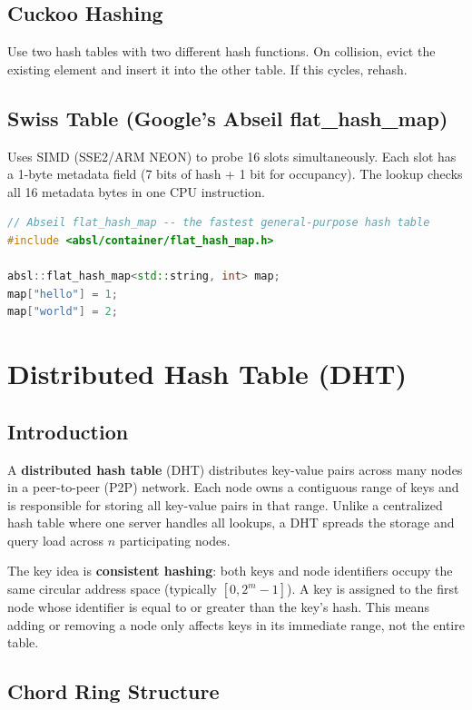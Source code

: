 \subsection{Cuckoo Hashing}

Use two hash tables with two different hash functions. On collision, evict the existing element and insert it into the other table. If this cycles, rehash.

\subsection{Swiss Table (Google's Abseil flat\_hash\_map)}

Uses SIMD (SSE2/ARM NEON) to probe 16 slots simultaneously. Each slot has a 1-byte metadata field (7 bits of hash + 1 bit for occupancy). The lookup checks all 16 metadata bytes in one CPU instruction.

\begin{lstlisting}[language=C++]
// Abseil flat_hash_map -- the fastest general-purpose hash table
#include <absl/container/flat_hash_map.h>

absl::flat_hash_map<std::string, int> map;
map["hello"] = 1;
map["world"] = 2;
\end{lstlisting}

\section{Distributed Hash Table (DHT)}

\subsection{Introduction}

A \textbf{distributed hash table} (DHT) distributes key-value pairs across many nodes in a peer-to-peer (P2P) network. Each node owns a contiguous range of keys and is responsible for storing all key-value pairs in that range. Unlike a centralized hash table where one server handles all lookups, a DHT spreads the storage and query load across $n$ participating nodes.

The key idea is \textbf{consistent hashing}: both keys and node identifiers occupy the same circular address space (typically $[0, 2^m - 1]$). A key is assigned to the first node whose identifier is equal to or greater than the key's hash. This means adding or removing a node only affects keys in its immediate range, not the entire table.

\subsection{Chord Ring Structure}

